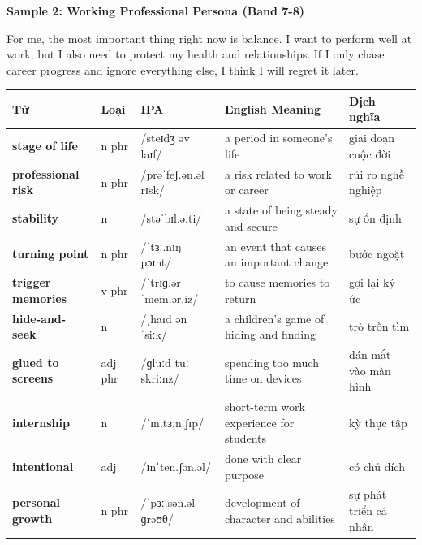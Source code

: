 \textbf{Sample 2: Working Professional Persona (Band 7-8)}

For me, the most important thing right now is balance. I want to perform well at work, but I also need to protect my health and relationships. If I only chase career progress and ignore everything else, I think I will regret it later.

\separator


\vspace{0.8em}
\begin{center}
\renewcommand{\arraystretch}{1.65}
\begin{tabularx}{\textwidth}{|V{0.22\textwidth}|C{0.07\textwidth}|I{0.20\textwidth}|Y|V{0.18\textwidth}|}
\hline
{}
\textbf{Từ} & \textbf{Loại} & \textbf{IPA} & \textbf{English Meaning} & \textbf{Dịch nghĩa} \\
\hline
\textbf{stage of life} & n phr & /steɪdʒ əv laɪf/ & a period in someone's life & giai đoạn cuộc đời \\ \hline
\textbf{professional risk} & n phr & /prəˈfeʃ.ən.əl rɪsk/ & a risk related to work or career & rủi ro nghề nghiệp \\ \hline
\textbf{stability} & n & /stəˈbɪl.ə.ti/ & a state of being steady and secure & sự ổn định \\ \hline
\textbf{turning point} & n phr & /ˈtɜː.nɪŋ pɔɪnt/ & an event that causes an important change & bước ngoặt \\ \hline
\textbf{trigger memories} & v phr & /ˈtrɪɡ.ər ˈmem.ər.iz/ & to cause memories to return & gợi lại ký ức \\ \hline
\textbf{hide-and-seek} & n & /ˌhaɪd ən ˈsiːk/ & a children's game of hiding and finding & trò trốn tìm \\ \hline
\textbf{glued to screens} & adj phr & /ɡluːd tuː skriːnz/ & spending too much time on devices & dán mắt vào màn hình \\ \hline
\textbf{internship} & n & /ˈɪn.tɜːn.ʃɪp/ & short-term work experience for students & kỳ thực tập \\ \hline
\textbf{intentional} & adj & /ɪnˈten.ʃən.əl/ & done with clear purpose & có chủ đích \\ \hline
\textbf{personal growth} & n phr & /ˈpɜː.sən.əl ɡrəʊθ/ & development of character and abilities & sự phát triển cá nhân \\ \hline
\end{tabularx}
\end{center}

